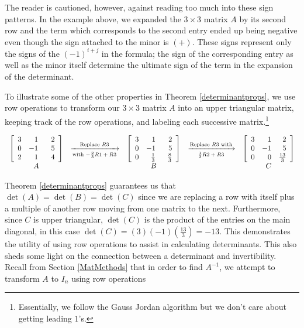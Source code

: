 The reader is cautioned, however, against reading too much into these sign patterns.  In the example above, we expanded the $3 \times 3$ matrix $A$ by its second row and the term which corresponds to the second entry ended up being negative even though the sign attached to the minor is $(+)$.  These signs represent only the signs of the $(-1)^{i+j}$ in the formula;  the sign of the corresponding entry as well as the minor itself determine the ultimate sign of the term in the expansion of the determinant.

\smallskip

To illustrate some of the other properties in  Theorem \ref{determinantprops}, we use row operations to transform our $3 \times 3$ matrix $A$ into an upper triangular matrix, keeping track of the row operations, and labeling each successive matrix.\footnote{Essentially, we follow the Gauss Jordan algorithm but we don't care about getting leading $1$'s.}


\[ \begin{array}{ccccc}

\left[ \begin{array}{rrr} 
3 &  1 & \hphantom{-}2 \\ 
0 & -1 & 5 \\ 
2 & 1 & 4 \\ 
\end{array} \right]

&
\xrightarrow[\text{with $-\frac{2}{3}R1+R3$}]{\text{Replace $R3$}}
&

\left[ \begin{array}{rrr} 
3 &  1 & \hphantom{-}2 \\ 
0 & -1 & 5 \\
0 & \frac{1}{3} & \frac{8}{3} \\ 
\end{array} \right]
&
\xrightarrow[\text{$\frac{1}{3}R2+R3$}]{\text{Replace $R3$ with}}
&

\left[ \begin{array}{rrr} 
3 &  1 & 2 \\ 
0 & -1 & 5 \\
0 & 0 & \frac{13}{3} \\ 
\end{array} \right] \\

A & & B & & C \\

\end{array}\]

Theorem \ref{determinantprops} guarantees us that $\det(A) = \det(B) = \det(C)$ since we are replacing a row with itself plus a multiple of another row moving from one matrix to the next.  Furthermore, since $C$ is upper triangular, $\det(C)$ is the product of the entries on the main diagonal, in this case  $\det(C) = (3)(-1)\left(\frac{13}{3}\right) = -13$.  This demonstrates the utility of using row operations to assist in calculating determinants.  This also sheds some light on the connection between a determinant and invertibility.  Recall from Section \ref{MatMethods} that in order to find $A^{-1}$, we attempt to transform $A$ to $I_{n}$ using row operations

